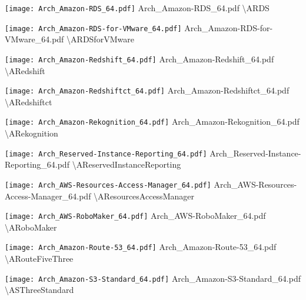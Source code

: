  {\texttt{[image: Arch\_Amazon-RDS\_64.pdf]}} {Arch\_Amazon-RDS\_64.pdf} {{\textbackslash}ARDS}

 {\texttt{[image: Arch\_Amazon-RDS-for-VMware\_64.pdf]}} {Arch\_Amazon-RDS-for-VMware\_64.pdf} {{\textbackslash}ARDSforVMware}

 {\texttt{[image: Arch\_Amazon-Redshift\_64.pdf]}} {Arch\_Amazon-Redshift\_64.pdf} {{\textbackslash}ARedshift}

 {\texttt{[image: Arch\_Amazon-Redshiftct\_64.pdf]}} {Arch\_Amazon-Redshiftct\_64.pdf} {{\textbackslash}ARedshiftct}

 {\texttt{[image: Arch\_Amazon-Rekognition\_64.pdf]}} {Arch\_Amazon-Rekognition\_64.pdf} {{\textbackslash}ARekognition}

 {\texttt{[image: Arch\_Reserved-Instance-Reporting\_64.pdf]}} {Arch\_Reserved-Instance-Reporting\_64.pdf} {{\textbackslash}AReservedInstanceReporting}

 {\texttt{[image: Arch\_AWS-Resources-Access-Manager\_64.pdf]}} {Arch\_AWS-Resources-Access-Manager\_64.pdf} {{\textbackslash}AResourcesAccessManager}

 {\texttt{[image: Arch\_AWS-RoboMaker\_64.pdf]}} {Arch\_AWS-RoboMaker\_64.pdf} {{\textbackslash}ARoboMaker}

 {\texttt{[image: Arch\_Amazon-Route-53\_64.pdf]}} {Arch\_Amazon-Route-53\_64.pdf} {{\textbackslash}ARouteFiveThree}

 {\texttt{[image: Arch\_Amazon-S3-Standard\_64.pdf]}} {Arch\_Amazon-S3-Standard\_64.pdf} {{\textbackslash}ASThreeStandard}

